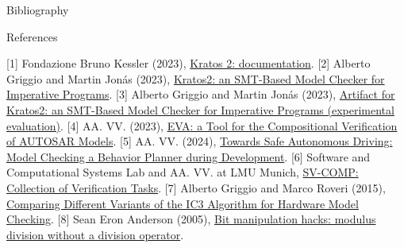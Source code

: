 \documentclass[aspectratio=1610,10.5pt]{beamer} %
\begin{document}
\begin{frame}{Bibliography}
    \begin{block}{References}
        {\footnotesize
            \begin{thebibliography}{9}
                 [1] Fondazione Bruno Kessler (2023), \href{https://kratos.fbk.eu/documentation.html}{Kratos 2: documentation}.
                 [2] Alberto Griggio and Martin Jonás (2023), \href{https://es-static.fbk.eu/people/griggio/papers/cav23a.pdf}{Kratos2: an SMT-Based Model Checker for Imperative Programs}.
                 [3] Alberto Griggio and Martin Jonás (2023), \href{https://doi.org/10.5281/zenodo.7876934}{Artifact for Kratos2: an SMT-Based Model Checker for Imperative Programs (experimental evaluation)}.
                 [4] AA. VV. (2023), \href{https://es-static.fbk.eu/people/griggio/papers/tacas23.pdf}{EVA: a Tool for the Compositional Verification of AUTOSAR Models}.
                 [5] AA. VV. (2024), \href{https://es-static.fbk.eu/people/griggio/papers/tacas24.pdf}{Towards Safe Autonomous Driving: Model Checking a Behavior Planner during Development}.
                 [6] Software and Computational Systems Lab and AA. VV. at LMU Munich, \href{https://gitlab.com/sosy-lab/benchmarking/sv-benchmarks/}{SV-COMP: Collection of Verification Tasks}.
                 [7] Alberto Griggio and Marco Roveri (2015), \href{https://es-static.fbk.eu/people/griggio/papers/tcad15.pdf}{Comparing Different Variants of the IC3 Algorithm for Hardware Model Checking}.
                 [8] Sean Eron Anderson (2005), \href{https://graphics.stanford.edu/~seander/bithacks.html}{Bit manipulation hacks: modulus division without a division operator}.
            \end{thebibliography}
        }
    \end{block}
\end{frame}
\end{document}
